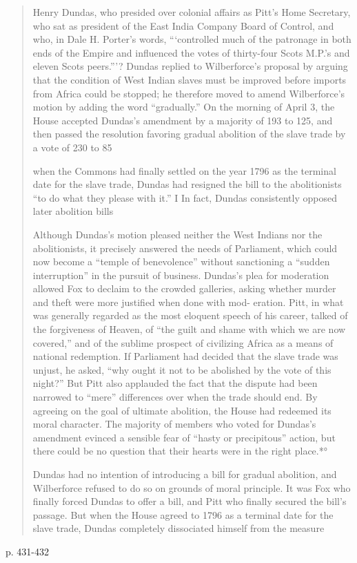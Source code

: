 \begin{quotation}
    Henry Dundas, who presided over colonial affairs as Pitt’s Home
Secretary, who sat as president of the East India Company Board of
Control, and who, in Dale H. Porter’s words, “‘controlled much of the
patronage in both ends of the Empire and influenced the votes of
thirty-four Scots M.P.’s and eleven Scots peers.”’? Dundas replied to
Wilberforce’s proposal by arguing that the condition of West Indian
slaves must be improved before imports from Africa could be stopped;
he therefore moved to amend Wilberforce’s motion by adding the
word “gradually.” On the morning of April 3, the House accepted
Dundas’s amendment by a majority of 193 to 125, and then passed the
resolution favoring gradual abolition of the slave trade by a vote of
230 to 85

when the Commons had finally settled on the year 1796 as the
terminal date for the slave trade, Dundas had resigned the bill to the abolitionists
``to do what they please with it.'' I In fact, Dundas consistently opposed later abolition bills


Although Dundas’s motion pleased neither the West Indians nor
the abolitionists, it precisely answered the needs of Parliament, which
could now become a “temple of benevolence” without sanctioning a
“sudden interruption” in the pursuit of business. Dundas’s plea for
moderation allowed Fox to declaim to the crowded galleries, asking
whether murder and theft were more justified when done with mod-
eration. Pitt, in what was generally regarded as the most eloquent
speech of his career, talked of the forgiveness of Heaven, of “the guilt
and shame with which we are now covered,” and of the sublime
prospect of civilizing Africa as a means of national redemption. If
Parliament had decided that the slave trade was unjust, he asked, “why
ought it not to be abolished by the vote of this night?” But Pitt also
applauded the fact that the dispute had been narrowed to “mere”
differences over when the trade should end. By agreeing on the goal
of ultimate abolition, the House had redeemed its moral character.
The majority of members who voted for Dundas’s amendment evinced
a sensible fear of “hasty or precipitous” action, but there could be no
question that their hearts were in the right place.*°

 Dundas had no intention of introducing a bill for gradual
abolition, and Wilberforce refused to do so on grounds of moral
principle. It was Fox who finally forced Dundas to offer a bill, and
Pitt who finally secured the bill’s passage. But when the House agreed
to 1796 as a terminal date for the slave trade, Dundas completely
dissociated himself from the measure
\end{quotation}
\cite{davis_1975}{p. 431-432}

